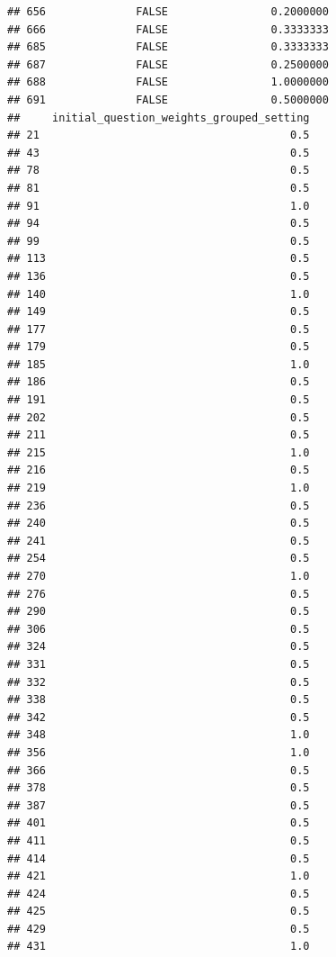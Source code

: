\documentclass[
]{article}
\begin{document}
\begin{verbatim}
## 656              FALSE                0.2000000
## 666              FALSE                0.3333333
## 685              FALSE                0.3333333
## 687              FALSE                0.2500000
## 688              FALSE                1.0000000
## 691              FALSE                0.5000000
##     initial_question_weights_grouped_setting
## 21                                       0.5
## 43                                       0.5
## 78                                       0.5
## 81                                       0.5
## 91                                       1.0
## 94                                       0.5
## 99                                       0.5
## 113                                      0.5
## 136                                      0.5
## 140                                      1.0
## 149                                      0.5
## 177                                      0.5
## 179                                      0.5
## 185                                      1.0
## 186                                      0.5
## 191                                      0.5
## 202                                      0.5
## 211                                      0.5
## 215                                      1.0
## 216                                      0.5
## 219                                      1.0
## 236                                      0.5
## 240                                      0.5
## 241                                      0.5
## 254                                      0.5
## 270                                      1.0
## 276                                      0.5
## 290                                      0.5
## 306                                      0.5
## 324                                      0.5
## 331                                      0.5
## 332                                      0.5
## 338                                      0.5
## 342                                      0.5
## 348                                      1.0
## 356                                      1.0
## 366                                      0.5
## 378                                      0.5
## 387                                      0.5
## 401                                      0.5
## 411                                      0.5
## 414                                      0.5
## 421                                      1.0
## 424                                      0.5
## 425                                      0.5
## 429                                      0.5
## 431                                      1.0

\end{verbatim}
\end{document}
